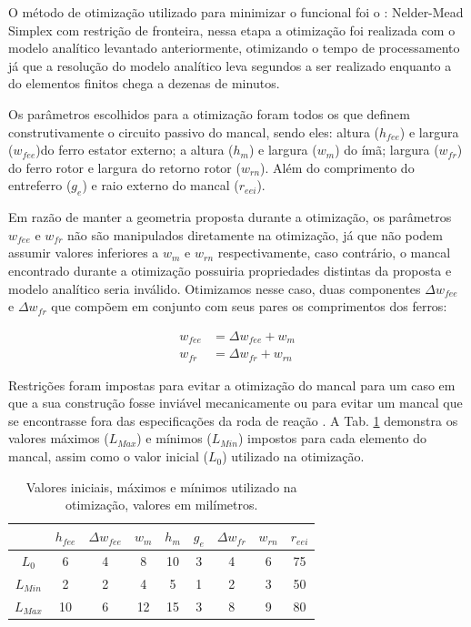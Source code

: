 O método de otimização utilizado para minimizar o funcional foi o :  Nelder-Mead Simplex com restrição de fronteira,  nessa etapa a otimização foi realizada com o modelo analítico levantado anteriormente, otimizando o tempo de processamento já que a resolução do modelo analítico leva segundos a ser realizado enquanto a do elementos finitos chega a dezenas de minutos.

Os parâmetros escolhidos para a otimização foram todos os que definem construtivamente o circuito passivo do mancal, sendo eles: altura  ($h_{fee}$) e largura  ($w_{fee}$)do ferro estator externo; a altura ($h_m$) e largura ($w_m$) do ímã;  largura ($w_{fr}$) do ferro rotor e largura do retorno rotor ($w_{rn}$). Além do comprimento do entreferro ($g_e$) e raio externo do mancal ($r_{eei}$).

Em razão de manter a geometria proposta durante a otimização, os parâmetros $w_{fee}$ e $w_{fr}$ não são manipulados diretamente na otimização, já que não podem assumir valores inferiores a $w_m$ e $w_{rn}$ respectivamente, caso contrário, o mancal encontrado durante a otimização possuiria propriedades distintas da proposta e modelo analítico seria inválido. Otimizamos nesse caso, duas componentes $\Delta w_{fee}$ e $\Delta w_{fr}$ que compõem em conjunto com seus pares os comprimentos dos ferros:

\begin{align}
w_{fee}  &= \Delta w_{fee} + w_m \\
w_{fr} &= \Delta w_{fr} + w_{rn}
\end{align}	

Restrições foram impostas para evitar a otimização do mancal para um caso em que a sua construção fosse inviável mecanicamente ou para evitar um mancal que se encontrasse fora das especificações da roda de reação . A Tab. \ref{tab:passivo:restrições} demonstra os valores máximos ($L_{Max}$) e mínimos ($L_{Min}$) impostos para cada elemento do mancal, assim como o valor inicial ($L_0$) utilizado na otimização.


\begin{table}[ht!]
	\centering
	\begin{tabular}{c c c c c c c c c}
		& $h_{fee}$ &$\Delta w_{fee}$ & $w_m$ & $h_m$  & $g_e$ & $\Delta w_{fr}$ & $w_{rn}$ & $r_{eei}$ \\ \hline \hline
		
		$L_{0}$ 	&  6 &   4 &    8 &    10 &   3 &  4 &   6 &    75 \\
		$L_{Min}$ &  2    &  2   &  4  &   5&    1  & 2  &  3&    50\\			
		$L_{Max}$ &  10 &  6 &  12  &   15  &  3  &  8  &   9   &   80		
	\end{tabular} 
	\caption{Valores iniciais, máximos e mínimos utilizado na otimização, valores em milímetros.}
	\label{tab:passivo:restrições} 
\end{table}

